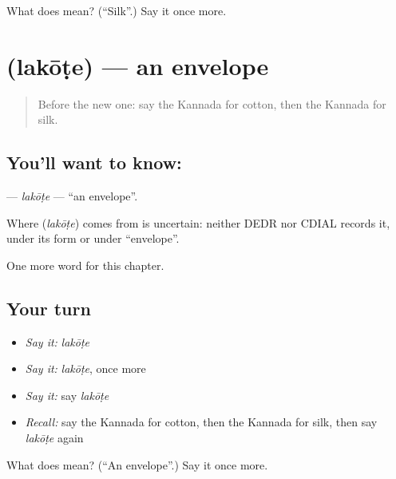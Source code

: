 \begin{tcolorbox}[breakable,colback=teal!4,colframe=teal!35!black,title={Before you move on}]
What does  mean? (\textquotedblleft{}Silk\textquotedblright{}.) Say it once more.
\end{tcolorbox}
\section[\texorpdfstring{\kn{ಲಕೋಟೆ} (lakōṭe)}{ಲಕೋಟೆ (lakōṭe)}]{ (lakōṭe) — an envelope}

\label{lesson:KA-C295-lakote}



\begin{quote}
Before the new one: say the Kannada for cotton, then the Kannada for silk.
\end{quote}

\subsection*{You'll want to know: }
\textbf{} — \emph{lakōṭe} — \textquotedblleft{}an envelope\textquotedblright{}.

\begin{cousinweb}
Where \textbf{} (\emph{lakōṭe}) comes from is uncertain: neither DEDR nor CDIAL records it, under its form or under \textquotedblleft{}envelope\textquotedblright{}.
\end{cousinweb}

\begin{grammarlens}[title={What you've built}]
One more word for this chapter.
\end{grammarlens}

\subsection*{Your turn}
\begin{itemize}
\raggedright
  \item \emph{Say it:} \emph{lakōṭe}
  \item \emph{Say it:} \emph{lakōṭe}, once more
  \item \emph{Say it:} say \emph{lakōṭe}
  \item \emph{Recall:} say the Kannada for cotton, then the Kannada for silk, then say \emph{lakōṭe} again
\end{itemize}

\begin{tcolorbox}[breakable,colback=teal!4,colframe=teal!35!black,title={Before you move on}]
What does  mean? (\textquotedblleft{}An envelope\textquotedblright{}.) Say it once more.
\end{tcolorbox}
